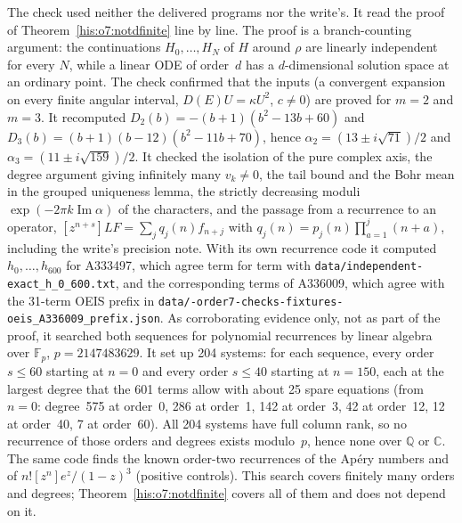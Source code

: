\documentclass[11pt]{article}
\theoremstyle{remark}\newtheorem{remark}[theorem]{Remark}
\DeclareMathOperator{\Ima}{Im}
\newcommand{\C}{\mathbb C}
\numberwithin{equation}{section}
\begin{document}
The check used neither the delivered programs nor the write's. It read the
proof of Theorem~\ref{his:o7:notdfinite} line by line. The proof is a
branch-counting argument: the continuations $H_0,\ldots,H_N$ of $H$ around
$\rho$ are linearly independent for every $N$, while a linear ODE of
order~$d$ has a $d$-dimensional solution space at an ordinary point. The
check confirmed that the inputs (a convergent expansion on every finite
angular interval, $D(E)U=\kappa U^2$, $c\ne0$) are proved for $m=2$ and
$m=3$. It recomputed $D_2(b)=-(b+1)(b^2-13b+60)$ and
$D_3(b)=(b+1)(b-12)(b^2-11b+70)$, hence $\alpha_2=(13\pm i\sqrt{71})/2$ and
$\alpha_3=(11\pm i\sqrt{159})/2$. It checked the isolation of the pure
complex axis, the degree argument giving infinitely many $v_k\ne0$, the
tail bound and the Bohr mean in the grouped uniqueness lemma, the strictly
decreasing moduli $\exp(-2\pi k\Ima\alpha)$ of the characters, and the
passage from a recurrence to an operator,
$[z^{n+s}]LF=\sum_jq_j(n)f_{n+j}$ with
$q_j(n)=p_j(n)\prod_{a=1}^{j}(n+a)$, including the write's precision note.
With its own recurrence code it computed $h_0,\ldots,h_{600}$ for A333497,
which agree term for term with
\texttt{data/\allowbreak independent-exact\_h\_0\_600.txt}, and the
corresponding terms of A336009, which agree with the 31-term OEIS prefix
in \texttt{data/-order7-checks-fixtures-\allowbreak oeis\_A336009\_prefix.json}.
As corroborating evidence only, not as part of the proof, it searched both
sequences for polynomial recurrences by linear algebra over
$\mathbb F_p$, $p=2147483629$. It set up 204 systems: for each sequence,
every order $s\le60$ starting at $n=0$ and every order $s\le40$ starting
at $n=150$, each at the largest degree that the 601 terms allow with about
25 spare equations (from $n=0$: degree~575 at order~0, 286 at order~1, 142
at order~3, 42 at order~12, 12 at order~40, 7 at order~60). All 204
systems have full column rank, so no recurrence of those orders and degrees
exists modulo~$p$, hence none over $\mathbb Q$ or $\C$. The same code finds
the known order-two recurrences of the Ap\'ery numbers and of
$n![z^n]e^z/(1-z)^3$ (positive controls). This search covers finitely many
orders and degrees; Theorem~\ref{his:o7:notdfinite} covers all of them and
does not depend on it.
\end{document}
